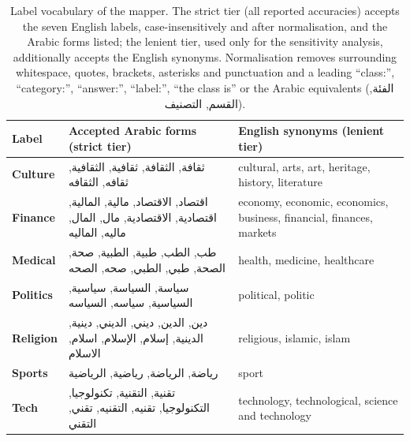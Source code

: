 \documentclass[preprint,12pt,authoryear]{elsarticle}
\newcommand{\RTL}[1]{\foreignlanguage{arabic}{#1}} %
\providecommand{\DIFaddbegin}{} %
\begin{document}
\DIFaddbegin \begin{table}[!ht]
\centering
\caption{Label vocabulary of the mapper. The strict tier (all reported accuracies) accepts the seven English labels, case-insensitively and after normalisation, and the Arabic forms listed; the lenient tier, used only for the sensitivity analysis, additionally accepts the English synonyms. Normalisation removes surrounding whitespace, quotes, brackets, asterisks and punctuation and a leading ``class:'', ``category:'', ``answer:'', ``label:'', ``the class is'' or the Arabic equivalents (\RTL{الفئة}, \RTL{القسم}, \RTL{التصنيف}).}
\label{tab:vocab}
\small
\begin{tabularx}{\textwidth}{@{}l >{\raggedright\arraybackslash}X >{\raggedright\arraybackslash}p{4.2cm}@{}}
\toprule
\textbf{Label} & \textbf{Accepted Arabic forms (strict tier)} & \textbf{English synonyms (lenient tier)} \\
\midrule
\textbf{Culture} & \RTL{ثقافة}, \RTL{الثقافة}, \RTL{ثقافية}, \RTL{الثقافية}, \RTL{ثقافه}, \RTL{الثقافه} & cultural, arts, art, heritage, history, literature \\
\textbf{Finance} & \RTL{اقتصاد}, \RTL{الاقتصاد}, \RTL{مالية}, \RTL{المالية}, \RTL{اقتصادية}, \RTL{الاقتصادية}, \RTL{مال}, \RTL{المال}, \RTL{ماليه}, \RTL{الماليه} & economy, economic, economics, business, financial, finances, markets \\
\textbf{Medical} & \RTL{طب}, \RTL{الطب}, \RTL{طبية}, \RTL{الطبية}, \RTL{صحة}, \RTL{الصحة}, \RTL{طبي}, \RTL{الطبي}, \RTL{صحه}, \RTL{الصحه} & health, medicine, healthcare \\
\textbf{Politics} & \RTL{سياسة}, \RTL{السياسة}, \RTL{سياسية}, \RTL{السياسية}, \RTL{سياسه}, \RTL{السياسه} & political, politic \\
\textbf{Religion} & \RTL{دين}, \RTL{الدين}, \RTL{ديني}, \RTL{الديني}, \RTL{دينية}, \RTL{الدينية}, \RTL{إسلام}, \RTL{الإسلام}, \RTL{اسلام}, \RTL{الاسلام} & religious, islamic, islam \\
\textbf{Sports} & \RTL{رياضة}, \RTL{الرياضة}, \RTL{رياضية}, \RTL{الرياضية} & sport \\
\textbf{Tech} & \RTL{تقنية}, \RTL{التقنية}, \RTL{تكنولوجيا}, \RTL{التكنولوجيا}, \RTL{تقنيه}, \RTL{التقنيه}, \RTL{تقني}, \RTL{التقني} & technology, technological, science and technology \\
\bottomrule
\end{tabularx}
\end{table}
\end{document}
